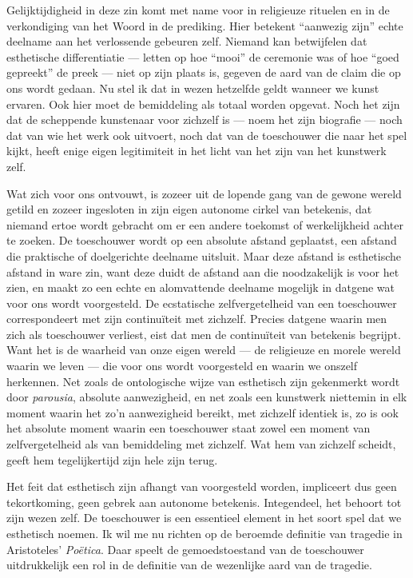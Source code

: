 Gelijktijdigheid in deze zin komt met name voor in religieuze rituelen en in de verkondiging van het Woord in de prediking. Hier betekent ``aanwezig zijn'' echte deelname aan het verlossende gebeuren zelf. Niemand kan betwijfelen dat esthetische differentiatie — letten op hoe ``mooi'' de ceremonie was of hoe ``goed gepreekt'' de preek — niet op zijn plaats is, gegeven de aard van de claim die op ons wordt gedaan. Nu stel ik dat in wezen hetzelfde geldt wanneer we kunst ervaren. Ook hier moet de bemiddeling als totaal worden opgevat. Noch het zijn dat de scheppende kunstenaar voor zichzelf is — noem het zijn biografie — noch dat van wie het werk ook uitvoert, noch dat van de toeschouwer die naar het spel kijkt, heeft enige eigen legitimiteit in het licht van het zijn van het kunstwerk zelf.

Wat zich voor ons ontvouwt, is zozeer uit de lopende gang van de gewone wereld getild en zozeer ingesloten in zijn eigen autonome cirkel van betekenis, dat niemand ertoe wordt gebracht om er een andere toekomst of werkelijkheid achter te zoeken. De toeschouwer wordt op een absolute afstand geplaatst, een afstand die praktische of doelgerichte deelname uitsluit. Maar deze afstand is esthetische afstand in ware zin, want deze duidt de afstand aan die noodzakelijk is voor het zien, en maakt zo een echte en alomvattende deelname mogelijk in datgene wat voor ons wordt voorgesteld. De ecstatische zelfvergetelheid van een toeschouwer correspondeert met zijn continuïteit met zichzelf. Precies datgene waarin men zich als toeschouwer verliest, eist dat men de continuïteit van betekenis begrijpt. Want het is de waarheid van onze eigen wereld — de religieuze en morele wereld waarin we leven — die voor ons wordt voorgesteld en waarin we onszelf herkennen. Net zoals de ontologische wijze van esthetisch zijn gekenmerkt wordt door \textit{parousia}, absolute aanwezigheid, en net zoals een kunstwerk niettemin in elk moment waarin het zo’n aanwezigheid bereikt, met zichzelf identiek is, zo is ook het absolute moment waarin een toeschouwer staat zowel een moment van zelfvergetelheid als van bemiddeling met zichzelf. Wat hem van zichzelf scheidt, geeft hem tegelijkertijd zijn hele zijn terug.

Het feit dat esthetisch zijn afhangt van voorgesteld worden, impliceert dus geen tekortkoming, geen gebrek aan autonome betekenis. Integendeel, het behoort tot zijn wezen zelf. De toeschouwer is een essentieel element in het soort spel dat we esthetisch noemen. Ik wil me nu richten op de beroemde definitie van tragedie in Aristoteles’ \textit{Poëtica}. Daar speelt de gemoedstoestand van de toeschouwer uitdrukkelijk een rol in de definitie van de wezenlijke aard van de tragedie.

